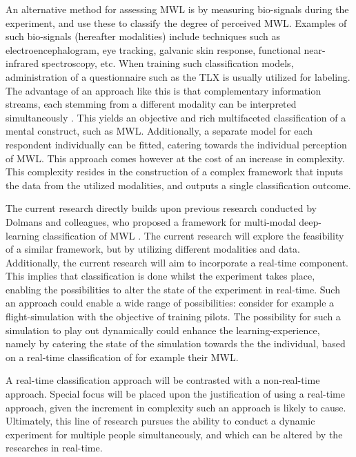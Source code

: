 \documentclass{article}
\begin{document}
An alternative method for assessing MWL is by measuring bio-signals during the experiment, and use these to classify the degree of perceived MWL. Examples of such bio-signals (hereafter modalities) include techniques such as electroencephalogram, eye tracking, galvanic skin response, functional near-infrared spectroscopy, etc. When training such classification models, administration of a questionnaire such as the TLX is usually utilized for labeling. The advantage of an approach like this is that complementary information streams, each stemming from a different modality can be interpreted simultaneously \cite{ramachandram2017deep}. This yields an objective and rich multifaceted classification of a mental construct, such as MWL. Additionally, a separate model for each respondent individually can be fitted, catering towards the individual perception of MWL. This approach comes however at the cost of an increase in complexity. This complexity resides in the construction of a complex framework that inputs the data from the utilized modalities, and outputs a single classification outcome. 

The current research directly builds upon previous research conducted by Dolmans and colleagues, who proposed a framework for multi-modal deep-learning classification of MWL \cite{dolmans2020perceived}. The current research will explore the feasibility of a similar framework, but by utilizing different modalities and data. Additionally, the current research will aim to incorporate a real-time component. This implies that classification is done whilst the experiment takes place, enabling the possibilities to alter the state of the experiment in real-time. Such an approach could enable a wide range of possibilities: consider for example a flight-simulation with the objective of training pilots. The possibility for such a simulation to play out dynamically could enhance the learning-experience, namely by catering the state of the simulation towards the the individual, based on a real-time classification of for example their MWL.

A real-time classification approach will be contrasted with a non-real-time approach. Special focus will be placed upon the justification of using a real-time approach, given the increment in complexity such an approach is likely to cause. Ultimately, this line of research pursues the ability to conduct a dynamic experiment for multiple people simultaneously, and which can be altered by the researches in real-time. 
\end{document}
